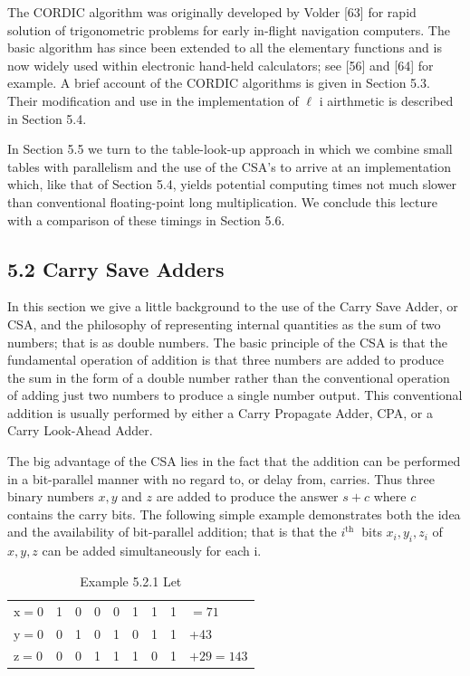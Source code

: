 \documentclass[10pt]{article}
\begin{document}
The CORDIC algorithm was originally developed by Volder [63] for rapid solution of trigonometric problems for early in-flight navigation computers. The basic algorithm has since been extended to all the elementary functions and is now widely used within electronic hand-held calculators; see [56] and [64] for example. A brief account of the CORDIC algorithms is given in Section 5.3. Their modification and use in the implementation of $\ell$ i airthmetic is described in Section 5.4.

In Section 5.5 we turn to the table-look-up approach in which we combine small tables with parallelism and the use of the CSA's to arrive at an implementation which, like that of Section 5.4, yields potential computing times not much slower than conventional floating-point long multiplication. We conclude this lecture with a comparison of these timings in Section 5.6.

\subsection*{5.2 Carry Save Adders}
In this section we give a little background to the use of the Carry Save Adder, or CSA, and the philosophy of representing internal quantities as the sum of two numbers; that is as double numbers. The basic principle of the CSA is that the fundamental operation of addition is that three numbers are added to produce the sum in the form of a double number rather than the conventional operation of adding just two numbers to produce a single number output. This conventional addition is usually performed by either a Carry Propagate Adder, CPA, or a Carry Look-Ahead Adder.

The big advantage of the CSA lies in the fact that the addition can be performed in a bit-parallel manner with no regard to, or delay from, carries. Thus three binary numbers $x, y$ and $z$ are added to produce the answer $s+c$ where $c$ contains the carry bits. The following simple example demonstrates both the idea and the availability of bit-parallel addition; that is that the $i^{\text {th }}$ bits $x_{i}, y_{i}, z_{i}$ of $x, y, z$ can be added simultaneously for each i.

\begin{table}[h]
\begin{center}
\captionsetup{labelformat=empty}
\caption{Example 5.2.1 Let}
\begin{tabular}{lllllllll}
$\mathrm{x}=0$ & 1 & 0 & 0 & 0 & 1 & 1 & 1 & $=71$ \\
$\mathrm{y}=0$ & 0 & 1 & 0 & 1 & 0 & 1 & 1 & +43 \\
$\mathrm{z}=0$ & 0 & 0 & 1 & 1 & 1 & 0 & 1 & $+29=143$ \\
\end{tabular}
\end{center}
\end{table}
\end{document}
